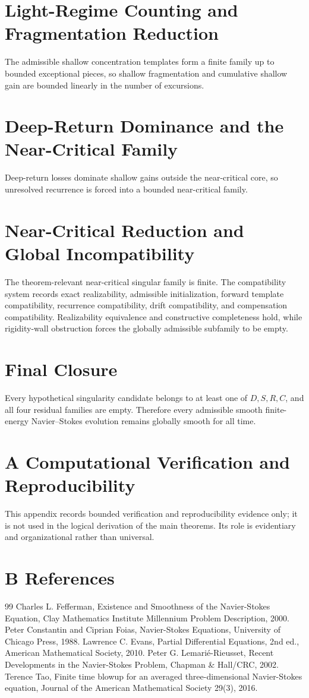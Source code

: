 \documentclass[11pt]{article}
\theoremstyle{definition}
\begin{document}
\section{Light-Regime Counting and Fragmentation Reduction}
The admissible shallow concentration templates form a finite family up to bounded exceptional pieces, so shallow fragmentation and cumulative shallow gain are bounded linearly in the number of excursions.
\section{Deep-Return Dominance and the Near-Critical Family}
Deep-return losses dominate shallow gains outside the near-critical core, so unresolved recurrence is forced into a bounded near-critical family.
\section{Near-Critical Reduction and Global Incompatibility}
The theorem-relevant near-critical singular family is finite. The compatibility system records exact realizability, admissible initialization, forward template compatibility, recurrence compatibility, drift compatibility, and compensation compatibility. Realizability equivalence and constructive completeness hold, while rigidity-wall obstruction forces the globally admissible subfamily to be empty.
\section{Final Closure}
Every hypothetical singularity candidate belongs to at least one of $D,S,R,C$, and all four residual families are empty. Therefore every admissible smooth finite-energy Navier--Stokes evolution remains globally smooth for all time.

\section*{A Computational Verification and Reproducibility}
This appendix records bounded verification and reproducibility evidence only; it is not used in the logical derivation of the main theorems. Its role is evidentiary and organizational rather than universal.

\section*{B References}
\begin{thebibliography}{99}
 Charles L. Fefferman, Existence and Smoothness of the Navier-Stokes Equation, Clay Mathematics Institute Millennium Problem Description, 2000.
 Peter Constantin and Ciprian Foias, Navier-Stokes Equations, University of Chicago Press, 1988.
 Lawrence C. Evans, Partial Differential Equations, 2nd ed., American Mathematical Society, 2010.
 Peter G. Lemarié-Rieusset, Recent Developments in the Navier-Stokes Problem, Chapman & Hall/CRC, 2002.
 Terence Tao, Finite time blowup for an averaged three-dimensional Navier-Stokes equation, Journal of the American Mathematical Society 29(3), 2016.
\end{thebibliography}
\end{document}
